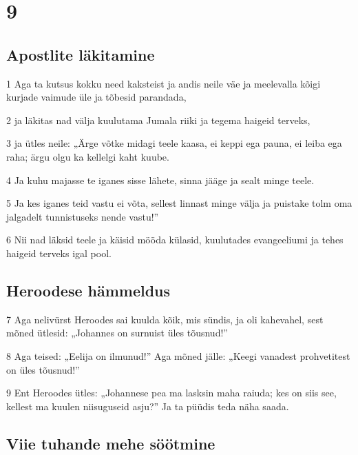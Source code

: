 \chapter{9}

\section*{Apostlite läkitamine}

\par 1 Aga ta kutsus kokku need kaksteist ja andis neile väe ja meelevalla kõigi kurjade vaimude üle ja tõbesid parandada,
\par 2 ja läkitas nad välja kuulutama Jumala riiki ja tegema haigeid terveks,
\par 3 ja ütles neile: „Ärge võtke midagi teele kaasa, ei keppi ega pauna, ei leiba ega raha; ärgu olgu ka kellelgi kaht kuube.
\par 4 Ja kuhu majasse te iganes sisse lähete, sinna jääge ja sealt minge teele.
\par 5 Ja kes iganes teid vastu ei võta, sellest linnast minge välja ja puistake tolm oma jalgadelt tunnistuseks nende vastu!”
\par 6 Nii nad läksid teele ja käisid mööda külasid, kuulutades evangeeliumi ja tehes haigeid terveks igal pool.

\section*{Heroodese hämmeldus}

\par 7 Aga nelivürst Heroodes sai kuulda kõik, mis sündis, ja oli kahevahel, sest mõned ütlesid: „Johannes on surnuist üles tõusnud!”
\par 8 Aga teised: „Eelija on ilmunud!” Aga mõned jälle: „Keegi vanadest prohvetitest on üles tõusnud!”
\par 9 Ent Heroodes ütles: „Johannese pea ma lasksin maha raiuda; kes on siis see, kellest ma kuulen niisuguseid asju?” Ja ta püüdis teda näha saada.

\section*{Viie tuhande mehe söötmine}

